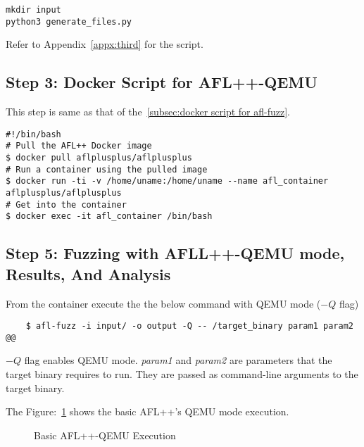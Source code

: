 \begin{verbatim}
mkdir input
python3 generate_files.py
\end{verbatim}

Refer to Appendix~\ref{appx:third} for the script.

\subsection*{Step 3: Docker Script for AFL++-QEMU}
This step is same as that of the~\ref{subsec:docker script for afl-fuzz}.

\begin{verbatim}
#!/bin/bash
# Pull the AFL++ Docker image
$ docker pull aflplusplus/aflplusplus
# Run a container using the pulled image
$ docker run -ti -v /home/uname:/home/uname --name afl_container aflplusplus/aflplusplus
# Get into the container
$ docker exec -it afl_container /bin/bash
\end{verbatim}

\subsection*{Step 5: Fuzzing with AFLL++-QEMU mode, Results, And Analysis}
From the container execute the the below command with
QEMU mode (\begin{math}-Q\end{math} flag)

\begin{verbatim}
    $ afl-fuzz -i input/ -o output -Q -- /target_binary param1 param2 @@
\end{verbatim}

\begin{math}-Q\end{math} flag enables QEMU mode.
\textit{param1} and \textit{param2} are parameters that the target binary requires to run.
They are passed as command-line arguments to the target binary.

The Figure:~\ref{fig:simplified_closed_binaries_qemu} shows the basic
AFL++'s QEMU mode execution.

\begin{figure}[H]
    \caption{Basic AFL++-QEMU Execution }\label{fig:simplified_closed_binaries_qemu}
\end{figure}

